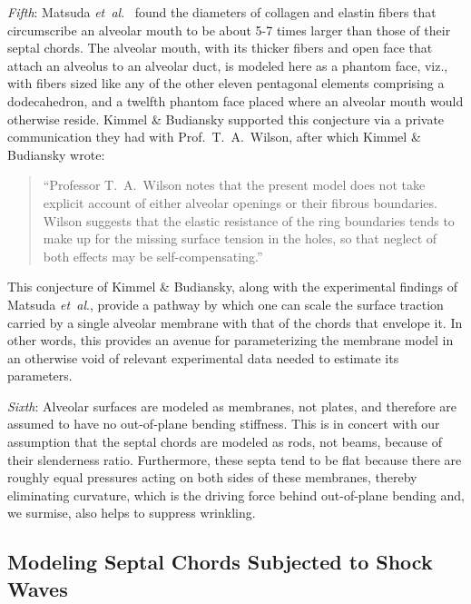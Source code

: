 \textit{Fifth\/}: Matsuda \textit{et~al}.\ \cite{Matsudaetal87} found the diameters of collagen and elastin fibers that circumscribe an alveolar mouth to be about 5-7 times larger than those of their septal chords.  The alveolar mouth, with its thicker fibers and open face that attach an alveolus to an alveolar duct, is modeled here as a phantom face, viz., with fibers sized like any of the other eleven pentagonal elements comprising a dodecahedron, and a twelfth phantom face placed where an alveolar mouth would otherwise reside. \cite{Freedetal12}  Kimmel \& Budiansky supported this conjecture via a private communication they had with Prof.\ T.\ A.\ Wilson, after which  Kimmel \& Budiansky wrote: \cite{KimmelBudiansky90}
\small
\begin{quote}
    ``Professor T.\ A.\ Wilson notes that the present model does not take explicit account of either alveolar openings or their fibrous boundaries.  Wilson suggests that the elastic resistance of the ring boundaries tends to make up for the missing surface tension in the holes, so that neglect of both effects may be self-compensating.''
\end{quote}
\normalsize
This conjecture of Kimmel \& Budiansky, along with the experimental findings of Matsuda \textit{et~al}., provide a pathway by which one can scale the surface traction carried by a single alveolar membrane with that of the chords that envelope it.  In other words, this provides an avenue for parameterizing the membrane model in an other\-wise void of relevant experimental data needed to estimate its parameters.

\textit{Sixth\/}: Alveolar surfaces are modeled as membranes, not plates, and therefore are assumed to have no out-of-plane bending stiffness.  This is in concert with our assumption that the septal chords are modeled as rods, not beams, because of their slenderness ratio.  Furthermore, these septa tend to be flat because there are roughly equal pressures acting on both sides of these membranes, thereby eliminating curvature, which is the driving force behind out-of-plane bending \cite{HoppinHildebrandt77} and, we surmise, also helps to suppress wrinkling.

\subsection{Modeling Septal Chords Subjected to Shock Waves}

